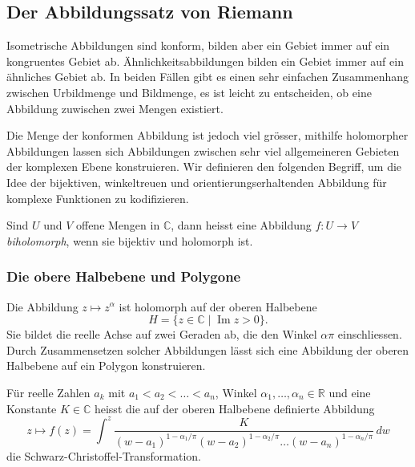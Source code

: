 %
%
%
\subsection{Der Abbildungssatz von Riemann}
Isometrische Abbildungen sind konform, bilden aber ein Gebiet immer
auf ein kongruentes Gebiet ab.
Ähnlichkeitsabbildungen bilden ein Gebiet immer auf ein ähnliches
Gebiet ab.
In beiden Fällen gibt es einen sehr einfachen Zusammenhang zwischen
Urbildmenge und Bildmenge, es ist leicht zu entscheiden,
ob eine Abbildung zuwischen zwei Mengen existiert.

Die Menge der konformen Abbildung ist jedoch viel grösser,
mithilfe holomorpher Abbildungen lassen sich Abbildungen
zwischen sehr viel allgemeineren Gebieten der komplexen Ebene
konstruieren.
Wir definieren den folgenden Begriff, um die Idee der
bijektiven, winkeltreuen und orientierungserhaltenden Abbildung
für komplexe Funktionen zu kodifizieren.

\begin{definition}[biholomorph]
Sind $U$ und $V$ offene Mengen in $\mathbb{C}$, dann heisst
eine Abbildung $f\colon U\to V$ \emph{biholomorph}, wenn sie bijektiv
und holomorph ist.
%
\end{definition}

%
%
\subsubsection{Die obere Halbebene und Polygone}
Die Abbildung $z\mapsto z^\alpha$ ist holomorph auf der oberen Halbebene
\[
H = \{z\in\mathbb{C}\mid \operatorname{Im}z> 0\}.
\]
%
%
Sie bildet die reelle Achse auf zwei Geraden ab, die den Winkel $\alpha \pi$
einschliessen.
Durch Zusammensetzen solcher Abbildungen lässt sich eine Abbildung
der oberen Halbebene auf ein Polygon konstruieren.

\begin{definition}
Für reelle Zahlen $a_k$ mit $a_1<a_2<\dots<a_n$, Winkel
$\alpha_1,\dots,\alpha_n\in\mathbb{R}$ und eine Konstante $K\in \mathbb{C}$
heisst die auf der oberen Halbebene definierte Abbildung
\[
z
\mapsto 
f(z)
=
\int^z \frac{K}{
(w-a_1)^{1-\alpha_1/\pi}
(w-a_2)^{1-\alpha_2/\pi}
\dots
(w-a_n)^{1-\alpha_n/\pi}
}\,dw
\]
die Schwarz-Christoffel-Transformation.
%
\end{definition}

